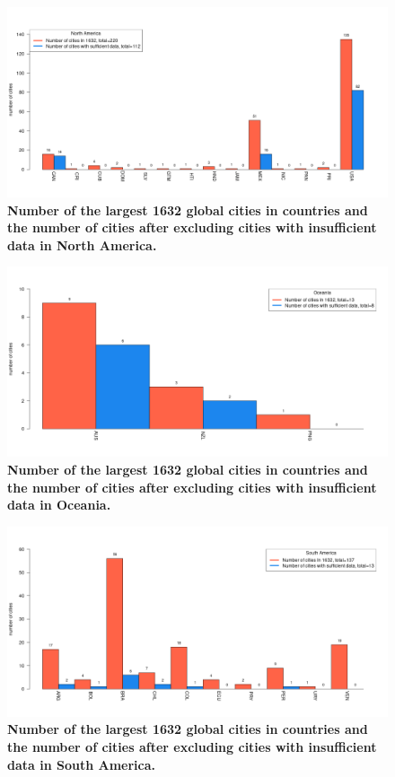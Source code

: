 \documentclass[preprint,10pt]{elsarticle} %
\begin{document}
\begin{figure}
\centering
\includegraphics[trim={ 0 35 25 50 },clip,scale=0.45]{Images/North America_cities.png}
\caption{\bf Number of the largest 1632 global cities in countries and the number of cities after excluding cities with insufficient data in North America.}
 \label{fig:northamerica}
\end{figure}

\begin{figure}
\centering
\includegraphics[trim={ 0 35 25 50 },clip,scale=0.45]{Images/Oceania_cities.png}
\caption{\bf Number of the largest 1632 global cities in countries and the number of cities after excluding cities with insufficient data in Oceania.}
 \label{fig:oceania}
\end{figure}

\begin{figure}
\centering
\includegraphics[trim={ 0 35 25 50 },clip,scale=0.45]{Images/South America_cities.png}
\caption{\bf Number of the largest 1632 global cities in countries and the number of cities after excluding cities with insufficient data in South America.}
 \label{fig:southhamerica}
\end{figure}
\end{document}

